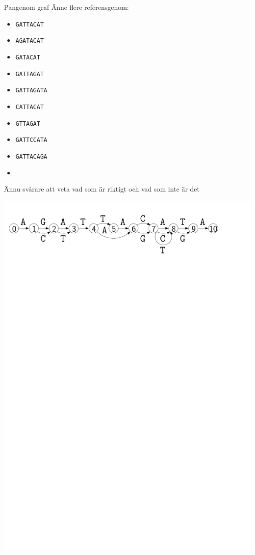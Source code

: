 \documentclass[11pt, aspectratio=169, table]{beamer}
\begin{document}
\begin{frame}{Pangenom graf}
Änne flere referensgenom:
\vspace{-0.3cm}\begin{multicols}{2}
\begin{itemize}
\item {\tt GATTACAT}
\item {\tt AGATACAT}
\item {\tt GATACAT}
\item {\tt GATTAGAT}
\item {\tt GATTAGATA}
\item {\tt CATTACAT}
\item {\tt GTTAGAT}
\item {\tt GATTCCATA}
\item {\tt GATTACAGA}
\item[]
\end{itemize}
\end{multicols}

\vspace{-0.3cm}Ännu svårare att veta vad som är riktigt och vad som inte är det
\begin{center}
\includegraphics[width=.9\textwidth]{graph_fuzzy.pdf}
\end{center}
\end{frame}
\end{document}
